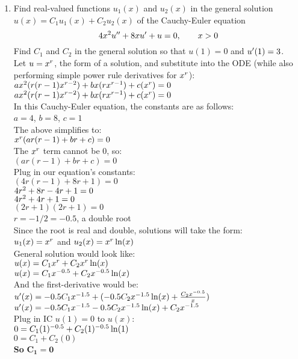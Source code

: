\documentclass{article}
\begin{document}
\begin{enumerate}
\begin{enumerate}
\item
Find real-valued functions $u_1(x)$ and $u_2(x)$ in the general solution $u(x)=C_1u_1(x)+C_2u_2(x)$ of the Cauchy-Euler equation
\[
4x\sp2u\sp{\prime\prime}+8xu\sp\prime+u=0,\qquad x>0
\]
Find $C_1$ and $C_2$ in the general solution so that $u(1)=0$ and $u\sp\prime(1)=3$.\\

\newpage
Let $u = x\sp{r}$, the form of a solution, and substitute into the ODE (while also performing simple power rule derivatives for $x\sp{r}$):\\
$ax\sp2(r(r-1)x\sp{r-2})+bx(rx\sp{r-1})+c(x\sp{r})=0$\\
$ax\sp2(r(r-1)x\sp{r-2})+bx(rx\sp{r-1})+c(x\sp{r})=0$\\

In this Cauchy-Euler equation, the constants are as follows:\\
$a=4$, $b=8$, $c=1$\\
The above simplifies to:\\
$x\sp{r}(ar(r-1)+br+c) = 0$\\
The $x\sp{r}$ term cannot be 0, so:\\
$(ar(r-1)+br+c) = 0$\\
Plug in our equation's constants:\\
$(4r(r-1)+8r+1) = 0$\\
$4r\sp{2} +8r - 4r + 1= 0$\\
$4r\sp{2} +4r + 1= 0$\\
$(2r+1)(2r+1)=0$\\
$r = -1/2 = -0.5$, a double root\\

Since the root is real and double, solutions will take the form:\\
$u_1(x) = x\sp{r}$ and $u_2(x) = x\sp{r}\ln(x)$\\
General solution would look like:\\
$u(x) = C_1x\sp{r} + C_2x\sp{r}\ln(x)$\\
$u(x) = C_1x\sp{-0.5} + C_2x\sp{-0.5}\ln(x)$\\

And the first-derivative would be:\\
$u\sp\prime(x) = -0.5C_1x\sp{-1.5} + (-0.5C_2x\sp{-1.5}\ln(x) + {C_2x\sp{-0.5} \over x})$\\
$u\sp\prime(x) = -0.5C_1x\sp{-1.5} - 0.5C_2x\sp{-1.5}\ln(x) + C_2x\sp{-1.5}$\\

Plug in IC $u(1)=0$ to $u(x)$:\\
$0 = C_1(1)\sp{-0.5} + C_2(1)\sp{-0.5}\ln(1)$\\
$0 = C_1 + C_2(0)$\\
\textbf{So} $\bm{C_1 = 0}$\\


\end{enumerate}
\end{enumerate}
\end{document}
